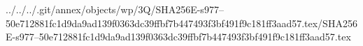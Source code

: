 ../../../.git/annex/objects/wp/3Q/SHA256E-s977--50e712881fc1d9da9ad139f0363dc39ffbf7b447493f3bf491f9c181ff3aad57.tex/SHA256E-s977--50e712881fc1d9da9ad139f0363dc39ffbf7b447493f3bf491f9c181ff3aad57.tex